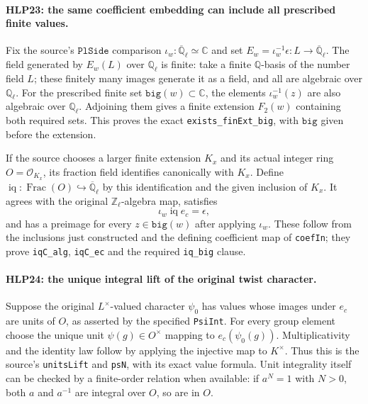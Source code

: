 \paragraph{HLP23: the same coefficient embedding can include all prescribed finite values.}
\label{claim:HLP23}
Fix the source's \(\texttt{PlSide}\) comparison
\(\iota_w:\overline{\mathbb Q}_\ell\simeq\mathbb C\) and set
\(E_w=\iota_w^{-1}\epsilon:L\to\overline{\mathbb Q}_\ell\).
The field generated by \(E_w(L)\) over \(\mathbb Q_\ell\) is
finite: take a finite \(\mathbb Q\)-basis of the number field
\(L\); these finitely many images generate it as a field, and
all are algebraic over \(\mathbb Q_\ell\). For the prescribed
finite set \(\texttt{big}(w)\subset\mathbb C\), the elements
\(\iota_w^{-1}(z)\) are also algebraic over
\(\mathbb Q_\ell\). Adjoining them gives a finite extension
\(F_2(w)\) containing both required sets. This proves the exact
\texttt{exists\_finExt\_big}, with \(\texttt{big}\) given before
the extension.

If the source chooses a larger finite extension \(K_x\) and its
actual integer ring \(O=\mathcal O_{K_x}\), its fraction field
identifies canonically with \(K_x\). Define
\(\operatorname{iq}:\operatorname{Frac}(O)\hookrightarrow
\overline{\mathbb Q}_\ell\) by this identification and the given
inclusion of \(K_x\). It agrees with the original
\(\mathbb Z_\ell\)-algebra map, satisfies
\[
             \iota_w\operatorname{iq}e_c=\epsilon,   \tag{HLP.22}
\]
and has a preimage for every \(z\in\texttt{big}(w)\) after
applying \(\iota_w\). These follow from the inclusions just
constructed and the defining coefficient map of
\texttt{coefIn}; they prove \texttt{iqC\_alg},
\texttt{iqC\_ec} and the required \texttt{iq\_big} clause.

\paragraph{HLP24: the unique integral lift of the original twist character.}
\label{claim:HLP24}
Suppose the original \(L^\times\)-valued character \(\psi_0\)
has values whose images under \(e_c\) are units of \(O\), as
asserted by the specified \texttt{PsiInt}. For every group element
choose the unique unit \(\psi(g)\in O^\times\) mapping to
\(e_c(\psi_0(g))\). Multiplicativity and the identity law follow
by applying the injective map to \(K^\times\). Thus this is the
source's \texttt{unitsLift} and \texttt{psN}, with its exact value
formula. Unit integrality itself can be checked by a finite-order
relation when available: if \(a^N=1\) with \(N>0\), both \(a\) and \(a^{-1}\)
are integral over \(O\), so are in \(O\).

